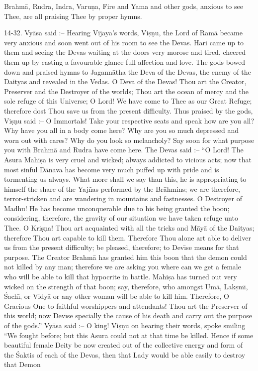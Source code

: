 Brahm\=a, Rudra, Indra, Varu\d{n}a, Fire and Yama and other gods, anxious to see Thee, are all praising Thee by proper hymns.

14-32. Vy\=asa said :-- Hearing Vijaya's words, Vi\d{s}\d{n}u, the Lord of Ram\=a became very anxious and soon went out of his room to see the Devas. Hari came up to them and seeing the Devas waiting at the doors very morose and tired, cheered them up by casting a favourable glance full affection and love. The gods bowed down and praised hymns to Jagann\=atha the Deva of the Devas, the enemy of the Daityas and revealed in the Vedas. O Deva of the Devas! Thou art the Creator, Preserver and the Destroyer of the worlds; Thou art the ocean of mercy and the sole refuge of this Universe; O Lord! We have come to Thee as our Great Refuge; therefore dost Thou save us from the present difficulty. Thus praised by the gods, Vi\d{s}\d{n}u said :-- O Immortals! Take your respective seats and speak how are you all? Why have you all in a body come here? Why are you so much depressed and worn out with cares? Why do you look so melancholy? Say soon for what purpose you with Brahm\=a and Rudra have come here. The Devas said :-- ``O Lord! The Asura Mahi\d{s}a is very cruel and wicked; always addicted to vicious acts; now that most sinful D\=anava has become very much puffed up with pride and is tormenting us always. What more shall we say than this, he is appropriating to himself the share of the Yaj\~nas performed by the Br\=ahmins; we are therefore, terror-stricken and are wandering in mountains and fastnesses. O Destroyer of Madhu! He has become unconquerable due to his being granted the boon; considering, therefore, the gravity of our situation we have taken refuge unto Thee. O Kri\d{s}\d{n}a! Thou art acquainted with all the tricks and M\=ay\=a of the Daityas; therefore Thou art capable to kill them. Therefore Thou alone art able to deliver us from the present difficulty; be pleased, therefore; to Dev\={\i}se means for that purpose. The Creator Brahm\=a has granted him this boon that the demon could not killed by any man; therefore we are asking you where can we get a female who will be able to kill that hypocrite in battle. Mahi\d{s}a has turned out very wicked on the strength of that boon; say, therefore, who amongst Um\=a, Lak\d{s}m\={\i}, \'Sach\={\i}, or Vidy\=a or any other woman will be able to kill him. Therefore, O Gracious One to faithful worshippers and attendants! Thou art the Preserver of this world; now Dev\={\i}se specially the cause of his death and carry out the purpose of the gods.'' Vy\=asa said :-- O king! Vi\d{s}\d{n}u on hearing their words, spoke smiling ``We fought before; but this Asura could not at that time be killed. Hence if some beautiful female Deity be now created out of the collective energy and form of the \'Saktis of each of the Devas, then that Lady would be able easily to destroy that Demon

